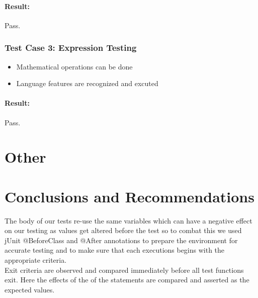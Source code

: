 \documentclass[english]{article}
\begin{document}
						\paragraph{Result: } Pass.

			\subsubsection{Test Case 3: Expression Testing}
			\begin{itemize}
			\item Mathematical operations can be done\\
			
			\item Language features are recognized and excuted\\
			\end{itemize}
						\paragraph{Result: } Pass.

		\section{Other}
		\section{Conclusions and Recommendations}
		The body of our tests re-use the same variables which can have a negative effect on our testing as values get altered before the test so to combat this we used jUnit @BeforeClass and @After annotations to prepare the environment for accurate testing and to make sure that each executions begins with the appropriate criteria.
		\\[4pt]
		Exit criteria are observed and compared immediately before all test functions exit. Here the effects of the of the statements are compared and asserted as the expected values.
		
\end{document}
